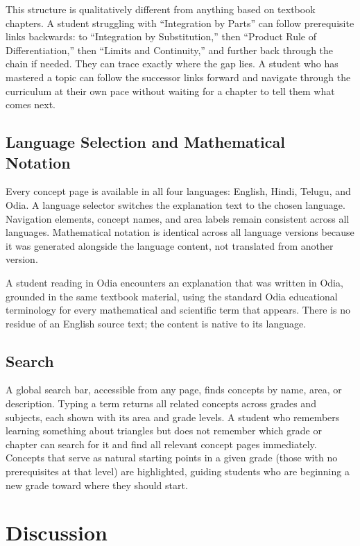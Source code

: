 \documentclass[12pt,a4paper]{article}
\begin{document}
This structure is qualitatively different from anything based on textbook chapters.
A student struggling with ``Integration by Parts'' can follow prerequisite links backwards:
to ``Integration by Substitution,'' then ``Product Rule of Differentiation,''
then ``Limits and Continuity,'' and further back through the chain if needed.
They can trace exactly where the gap lies.
A student who has mastered a topic can follow the successor links forward and navigate
through the curriculum at their own pace without waiting for a chapter to tell them
what comes next.

\subsection{Language Selection and Mathematical Notation}

Every concept page is available in all four languages: English, Hindi, Telugu, and Odia.
A language selector switches the explanation text to the chosen language.
Navigation elements, concept names, and area labels remain consistent across all languages.
Mathematical notation is identical across all language versions
because it was generated alongside the language content, not translated from another version.

A student reading in Odia encounters an explanation that was written in Odia,
grounded in the same textbook material, using the standard Odia educational terminology
for every mathematical and scientific term that appears.
There is no residue of an English source text; the content is native to its language.

\subsection{Search}

A global search bar, accessible from any page, finds concepts by name, area, or description.
Typing a term returns all related concepts across grades and subjects,
each shown with its area and grade levels.
A student who remembers learning something about triangles but does not remember
which grade or chapter can search for it and find all relevant concept pages immediately.
Concepts that serve as natural starting points in a given grade (those with no prerequisites
at that level) are highlighted, guiding students who are beginning a new grade toward
where they should start.

\section{Discussion}
\end{document}
